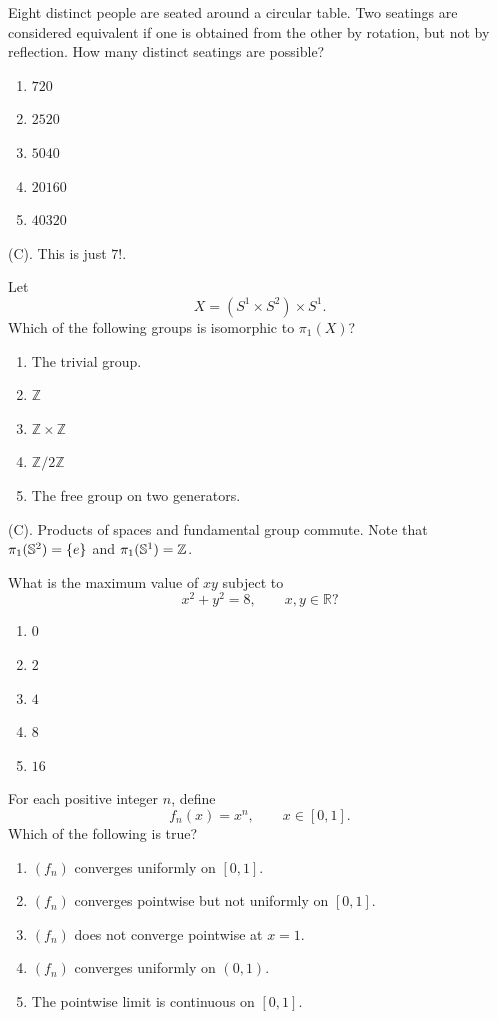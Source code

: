 \begin{exercise}
Eight distinct people are seated around a circular table. Two seatings are considered
equivalent if one is obtained from the other by rotation, but not by reflection.
How many distinct seatings are possible?
\begin{enumerate}[label=(\Alph*)]
\item $720$
\item $2520$
\item $5040$
\item $20160$
\item $40320$
\end{enumerate}
\end{exercise}
\begin{solution}
(C). This is just $7!$.
\end{solution}

\begin{exercise}
Let
\[
X=(S^1\times S^2)\times S^1.
\]
Which of the following groups is
isomorphic to $\pi_1(X)$?
\begin{enumerate}[label=(\Alph*)]
\item The trivial group.
\item $\mathbb Z$
\item $\mathbb Z\times\mathbb Z$
\item $\mathbb Z/2\mathbb Z$
\item The free group on two generators.
\end{enumerate}
\end{exercise}
\begin{solution}
(C). Products of spaces and fundamental group commute. Note that 
$\pi_1(\S^2) = \{e\}$ and $\pi_1(\S^1) = \Z$.
\end{solution}

\begin{exercise}
What is the maximum value of $xy$
subject to
\[
x^2+y^2=8,
\qquad x,y\in\mathbb R?
\]
\begin{enumerate}[label=(\Alph*)]
\item $0$
\item $2$
\item $4$
\item $8$
\item $16$
\end{enumerate}
\end{exercise}

\begin{exercise}
For each positive integer $n$, define
\[
f_n(x)=x^n,\qquad x\in[0,1].
\]
Which of the following is true?
\begin{enumerate}[label=(\Alph*)]
\item $(f_n)$ converges uniformly on $[0,1]$.
\item $(f_n)$ converges pointwise but not
uniformly on $[0,1]$.
\item $(f_n)$ does not converge pointwise
at $x=1$.
\item $(f_n)$ converges uniformly on $(0,1)$.
\item The pointwise limit is continuous on $[0,1]$.
\end{enumerate}
\end{exercise}

